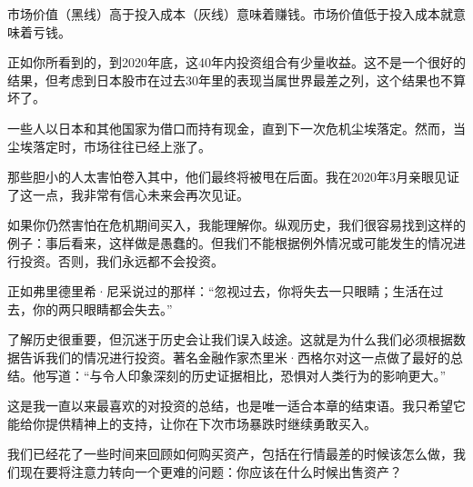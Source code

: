 市场价值（黑线）高于投入成本（灰线）意味着赚钱。市场价值低于投入成本就意味着亏钱。

正如你所看到的，到2020年底，这40年内投资组合有少量收益。这不是一个很好的结果，但考虑到日本股市在过去30年里的表现当属世界最差之列，这个结果也不算坏了。

一些人以日本和其他国家为借口而持有现金，直到下一次危机尘埃落定。然而，当尘埃落定时，市场往往已经上涨了。

那些胆小的人太害怕卷入其中，他们最终将被甩在后面。我在2020年3月亲眼见证了这一点，我非常有信心未来会再次见证。

如果你仍然害怕在危机期间买入，我能理解你。纵观历史，我们很容易找到这样的例子：事后看来，这样做是愚蠢的。但我们不能根据例外情况或可能发生的情况进行投资。否则，我们永远都不会投资。

正如弗里德里希·尼采说过的那样：“忽视过去，你将失去一只眼睛；生活在过去，你的两只眼睛都会失去。”

了解历史很重要，但沉迷于历史会让我们误入歧途。这就是为什么我们必须根据数据告诉我们的情况进行投资。著名金融作家杰里米·西格尔对这一点做了最好的总结。他写道：“与令人印象深刻的历史证据相比，恐惧对人类行为的影响更大。”

这是我一直以来最喜欢的对投资的总结，也是唯一适合本章的结束语。我只希望它能给你提供精神上的支持，让你在下次市场暴跌时继续勇敢买入。

我们已经花了一些时间来回顾如何购买资产，包括在行情最差的时候该怎么做，我们现在要将注意力转向一个更难的问题：你应该在什么时候出售资产？

